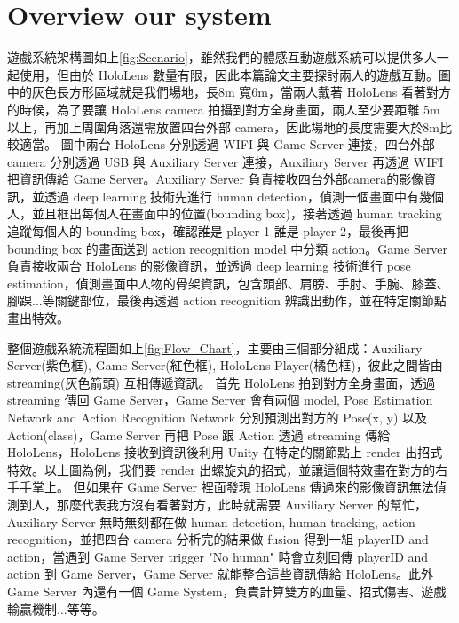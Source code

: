 
\section{Overview our system}


遊戲系統架構圖如上\ref{fig:Scenario}，雖然我們的體感互動遊戲系統可以提供多人一起使用，但由於 HoloLens 數量有限，因此本篇論文主要探討兩人的遊戲互動。圖中的灰色長方形區域就是我們場地，長8m 寬6m，當兩人戴著 HoloLens 看著對方的時候，為了要讓 HoloLens camera 拍攝到對方全身畫面，兩人至少要距離 5m 以上，再加上周圍角落還需放置四台外部 camera，因此場地的長度需要大於8m比較適當。
圖中兩台 HoloLens 分別透過 WIFI 與 Game Server 連接，四台外部 camera 分別透過 USB 與 Auxiliary Server 連接，Auxiliary Server 再透過 WIFI 把資訊傳給 Game Server。Auxiliary Server 負責接收四台外部camera的影像資訊，並透過 deep learning 技術先進行 human detection，偵測一個畫面中有幾個人，並且框出每個人在畫面中的位置(bounding box)，接著透過 human tracking 追蹤每個人的 bounding box，確認誰是 player 1 誰是 player 2，最後再把 bounding box 的畫面送到 action recognition model 中分類 action。Game Server 負責接收兩台 HoloLens 的影像資訊，並透過 deep learning 技術進行 pose estimation，偵測畫面中人物的骨架資訊，包含頭部、肩膀、手肘、手腕、膝蓋、腳踝...等關鍵部位，最後再透過 action recognition 辨識出動作，並在特定關節點畫出特效。


整個遊戲系統流程圖如上\ref{fig:Flow_Chart}，主要由三個部分組成：Auxiliary Server(紫色框), Game Server(紅色框), HoloLens Player(橘色框)，彼此之間皆由 streaming(灰色箭頭) 互相傳遞資訊。
首先 HoloLens 拍到對方全身畫面，透過 streaming 傳回 Game Server，Game Server 會有兩個 model, Pose Estimation Network and Action Recognition Network 分別預測出對方的 Pose(x, y) 以及 Action(class)，Game Server 再把 Pose 跟 Action 透過 streaming 傳給 HoloLens，HoloLens 接收到資訊後利用 Unity 在特定的關節點上 render 出招式特效。以上圖為例，我們要 render 出螺旋丸的招式，並讓這個特效畫在對方的右手手掌上。
但如果在 Game Server 裡面發現 HoloLens 傳過來的影像資訊無法偵測到人，那麼代表我方沒有看著對方，此時就需要 Auxiliary Server 的幫忙，Auxiliary Server 無時無刻都在做 human detection, human tracking, action recognition，並把四台 camera 分析完的結果做 fusion 得到一組 playerID and action，當遇到 Game Server trigger "No human" 時會立刻回傳 playerID and action 到 Game Server，Game Server 就能整合這些資訊傳給 HoloLens。此外 Game Server 內還有一個 Game System，負責計算雙方的血量、招式傷害、遊戲輸贏機制...等等。

